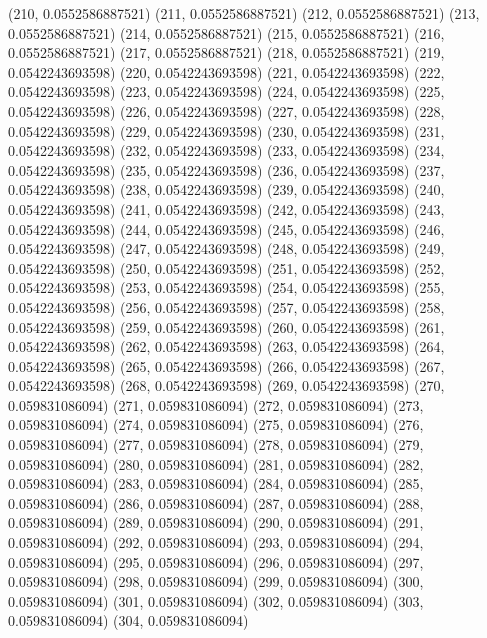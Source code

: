 {					(210, 0.0552586887521)
					(211, 0.0552586887521)
					(212, 0.0552586887521)
					(213, 0.0552586887521)
					(214, 0.0552586887521)
					(215, 0.0552586887521)
					(216, 0.0552586887521)
					(217, 0.0552586887521)
					(218, 0.0552586887521)
					(219, 0.0542243693598)
					(220, 0.0542243693598)
					(221, 0.0542243693598)
					(222, 0.0542243693598)
					(223, 0.0542243693598)
					(224, 0.0542243693598)
					(225, 0.0542243693598)
					(226, 0.0542243693598)
					(227, 0.0542243693598)
					(228, 0.0542243693598)
					(229, 0.0542243693598)
					(230, 0.0542243693598)
					(231, 0.0542243693598)
					(232, 0.0542243693598)
					(233, 0.0542243693598)
					(234, 0.0542243693598)
					(235, 0.0542243693598)
					(236, 0.0542243693598)
					(237, 0.0542243693598)
					(238, 0.0542243693598)
					(239, 0.0542243693598)
					(240, 0.0542243693598)
					(241, 0.0542243693598)
					(242, 0.0542243693598)
					(243, 0.0542243693598)
					(244, 0.0542243693598)
					(245, 0.0542243693598)
					(246, 0.0542243693598)
					(247, 0.0542243693598)
					(248, 0.0542243693598)
					(249, 0.0542243693598)
					(250, 0.0542243693598)
					(251, 0.0542243693598)
					(252, 0.0542243693598)
					(253, 0.0542243693598)
					(254, 0.0542243693598)
					(255, 0.0542243693598)
					(256, 0.0542243693598)
					(257, 0.0542243693598)
					(258, 0.0542243693598)
					(259, 0.0542243693598)
					(260, 0.0542243693598)
					(261, 0.0542243693598)
					(262, 0.0542243693598)
					(263, 0.0542243693598)
					(264, 0.0542243693598)
					(265, 0.0542243693598)
					(266, 0.0542243693598)
					(267, 0.0542243693598)
					(268, 0.0542243693598)
					(269, 0.0542243693598)
					(270, 0.059831086094)
					(271, 0.059831086094)
					(272, 0.059831086094)
					(273, 0.059831086094)
					(274, 0.059831086094)
					(275, 0.059831086094)
					(276, 0.059831086094)
					(277, 0.059831086094)
					(278, 0.059831086094)
					(279, 0.059831086094)
					(280, 0.059831086094)
					(281, 0.059831086094)
					(282, 0.059831086094)
					(283, 0.059831086094)
					(284, 0.059831086094)
					(285, 0.059831086094)
					(286, 0.059831086094)
					(287, 0.059831086094)
					(288, 0.059831086094)
					(289, 0.059831086094)
					(290, 0.059831086094)
					(291, 0.059831086094)
					(292, 0.059831086094)
					(293, 0.059831086094)
					(294, 0.059831086094)
					(295, 0.059831086094)
					(296, 0.059831086094)
					(297, 0.059831086094)
					(298, 0.059831086094)
					(299, 0.059831086094)
					(300, 0.059831086094)
					(301, 0.059831086094)
					(302, 0.059831086094)
					(303, 0.059831086094)
					(304, 0.059831086094)
}
